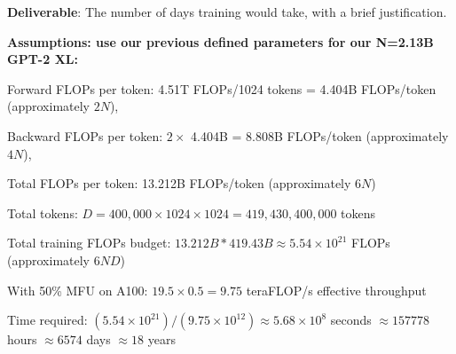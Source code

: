 \begin{enumerate}[label=(\alph*)]
    \textbf{Deliverable}: The number of days training would take, with a brief justification.

    \begin{answer}
    \textbf{Assumptions: use our previous defined parameters for our N=2.13B GPT-2 XL:}
    
    Forward FLOPs per token: 4.51T FLOPs/1024 tokens = 4.404B FLOPs/token (approximately $2N$), 

    Backward FLOPs per token: $2 \times$ 4.404B = 8.808B FLOPs/token (approximately $4N$),

    Total FLOPs per token: 13.212B FLOPs/token (approximately $6N$)

    Total tokens: $D = 400,000 \times 1024 \times 1024 = 419,430,400,000$ tokens

    Total training FLOPs budget: $13.212B * 419.43B \approx 5.54 \times 10^{21}$ FLOPs (approximately $6ND$)

    With 50\% MFU on A100: $19.5 \times 0.5 = 9.75$ teraFLOP/s effective throughput

    Time required: $(5.54 \times 10^{21}) / (9.75 \times 10^{12}) \approx 5.68 \times 10^{8}$ seconds $\approx 157778$ hours  $\approx 6574$ days $\approx 18$ years
    \end{answer}
\end{enumerate}